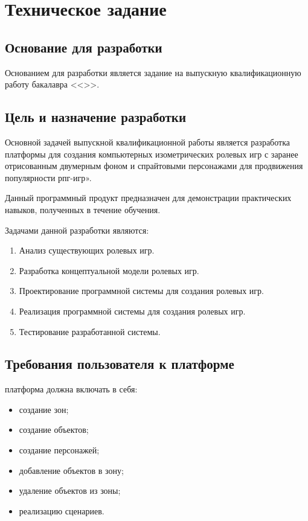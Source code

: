 \section{Техническое задание}
\subsection{Основание для разработки}

Основанием для разработки является задание на выпускную квалификационную работу бакалавра << >>.

\subsection{Цель и назначение разработки}

Основной задачей выпускной квалификационной работы является разработка платформы для создания компьютерных изометрических ролевых игр с заранее отрисованным двумерным фоном и спрайтовыми персонажами для продвижения популярности рпг-игр».

Данный программный продукт предназначен для демонстрации практических навыков, полученных в течение обучения.

Задачами данной разработки являются:
\begin{enumerate}
\item Анализ существующих ролевых игр.
\item Разработка концептуальной модели ролевых игр.
\item Проектирование программной системы для создания ролевых игр.
\item Реализация программной системы для создания ролевых игр.
\item Тестирование разработанной системы.
\end{enumerate}

\subsection{Требования пользователя к платформе}

платформа должна включать в себя:
\begin{itemize}
    \item создание зон;
    \item создание объектов;
    \item создание персонажей;
    \item добавление объектов в зону;
    \item удаление объектов из зоны;
    \item реализацию сценариев.
\end{itemize}


